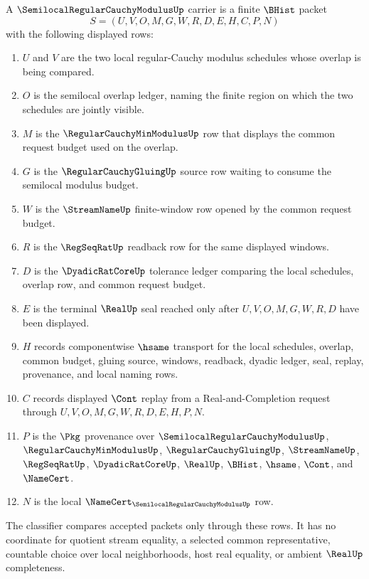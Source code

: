 \begin{definition}
\label{def:semilocal-regular-cauchy-modulus-carrier}
A $\SemilocalRegularCauchyModulusUp$ carrier is a finite $\BHist$ packet
$$
S=(U,V,O,M,G,W,R,D,E,H,C,P,N)
$$
with the following displayed rows:
\begin{enumerate}
\item $U$ and $V$ are the two local regular-Cauchy modulus schedules whose overlap is being compared.
\item $O$ is the semilocal overlap ledger, naming the finite region on which the two schedules are jointly visible.
\item $M$ is the $\RegularCauchyMinModulusUp$ row that displays the common request budget used on the overlap.
\item $G$ is the $\RegularCauchyGluingUp$ source row waiting to consume the semilocal modulus budget.
\item $W$ is the $\StreamNameUp$ finite-window row opened by the common request budget.
\item $R$ is the $\RegSeqRatUp$ readback row for the same displayed windows.
\item $D$ is the $\DyadicRatCoreUp$ tolerance ledger comparing the local schedules, overlap row, and common request budget.
\item $E$ is the terminal $\RealUp$ seal reached only after $U,V,O,M,G,W,R,D$ have been displayed.
\item $H$ records componentwise $\hsame$ transport for the local schedules, overlap, common budget, gluing source, windows, readback, dyadic ledger, seal, replay, provenance, and local naming rows.
\item $C$ records displayed $\Cont$ replay from a Real-and-Completion request through $U,V,O,M,G,W,R,D,E,H,P,N$.
\item $P$ is the $\Pkg$ provenance over $\SemilocalRegularCauchyModulusUp$, $\RegularCauchyMinModulusUp$, $\RegularCauchyGluingUp$, $\StreamNameUp$, $\RegSeqRatUp$, $\DyadicRatCoreUp$, $\RealUp$, $\BHist$, $\hsame$, $\Cont$, and $\NameCert$.
\item $N$ is the local $\NameCert_{\SemilocalRegularCauchyModulusUp}$ row.
\end{enumerate}
The classifier compares accepted packets only through these rows. It has no coordinate for quotient stream equality, a selected common representative, countable choice over local neighborhoods, host real equality, or ambient $\RealUp$ completeness.
\end{definition}


